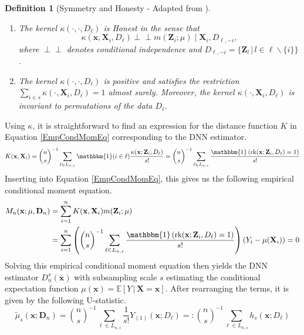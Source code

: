 \documentclass[letterpaper,10pt]{article}
\numberwithin{equation}{section}
\numberwithin{thm}{section}
\newtheorem{dfn}{Definition}
\numberwithin{lem}{section}
\numberwithin{cor}{section}
\newcommand{\E}{\mathbb{E}}
\newcommand{\1}{\mathbbm{1}}
\newcommand{\rk}{\text{rk}}
\newcommand{\indep}{\perp\!\!\!\!\perp}
\begin{document}
\begin{dfn}[Symmetry and Honesty - Adapted from \citet{ritzwoller_uniform_2024}]\label{Symmetry_Honesty}\mbox{}
	\begin{enumerate}
		\item The kernel $\kappa\left(\cdot, \cdot, D_{\ell}\right)$ is Honest in the sense that
		      $$\kappa\left(\mathbf{x}, \mathbf{X}_i, D_{\ell}\right) \indep m\left(\mathbf{Z}_i ; \mu\right) \mid \mathbf{X}_i, D_{\ell,-i},$$
		      where $\indep$ denotes conditional independence and $D_{\ell,-i} = \{\mathbf{Z}_l \, | \, l \in \ell \backslash \{i\}\}$.
		\item The kernel $\kappa\left(\cdot, \cdot, D_{\ell}\right)$ is positive and satisfies the restriction
		      $\sum_{i \in s} \kappa\left(\cdot, \mathbf{X}_i, D_{\ell}\right)=1$ almost surely.
		      Moreover, the kernel $\kappa\left(\cdot, \mathbf{X}_i, D_{\ell}\right)$ is invariant to permutations of the data $D_{\ell}.$
	\end{enumerate}
\end{dfn}
Using $\kappa$, it is straightforward to find an expression for the distance function $K$ in Equation \ref{EmpCondMomEq} corresponding to the DNN estimator.
\begin{equation}
	K(\mathbf{x}, \mathbf{X}_i)
	= \binom{n}{s}^{-1} \sum_{\ell \in L_{n,s}} \1(i \in \ell)\frac{\kappa(\mathbf{x}; \mathbf{Z}_i, D_{\ell})}{s!}
	= \binom{n}{s}^{-1} \sum_{\ell \in L_{n,s}} \frac{\1\left(\rk(\mathbf{x}; \mathbf{Z}_i, D_{\ell}) = 1\right)}{s!}
\end{equation}
Inserting into Equation \ref{EmpCondMomEq}, this gives us the following empirical conditional moment equation.
\begin{equation}
	\begin{aligned}
		M_n(\mathbf{x}; \mu, \mathbf{D}_n)
		 & = \sum_{i = 1}^{n}K(\mathbf{x}, \mathbf{X}_i)m(\mathbf{Z}_i; \mu)                                                                                                                  \\
		 & = \sum_{i = 1}^{n}\left(\binom{n}{s}^{-1} \sum_{\ell \in L_{n,s}} \frac{\1\left(\rk(\mathbf{x}; \mathbf{Z}_i, D_{\ell}) = 1\right)}{s!}\right)\left(Y_i - \mu(\mathbf{X}_i)\right)
		= 0
	\end{aligned}
\end{equation}
Solving this empirical conditional moment equation then yields the DNN estimator $D_{n}^{s}(\mathbf{x})$ with subsampling scale $s$ estimating the conditional expectation function $\mu(\mathbf{x}) = \E\left[Y \, | \, \mathbf{X} = \mathbf{x}\right]$.
After rearranging the terms, it is given by the following U-statistic.
\begin{equation}\label{U_stat}
	\tilde{\mu}_{s}(\mathbf{x}; \mathbf{D}_n)
	= \binom{n}{s}^{-1} \sum_{\ell \in L_{n,s}} \frac{1}{s!} Y_{(1)}(\mathbf{x}; D_{\ell})
	=: \binom{n}{s}^{-1} \sum_{\ell \in L_{n,s}} h_{s}(\mathbf{x}; D_{\ell})
\end{equation}
\end{document}
